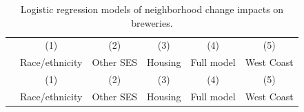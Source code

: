 \documentclass[]{article}
\begin{document}
\begin{landscape}
\begin{longtable}[c]{@{}lccccc@{}}
  \caption{Logistic regression models of neighborhood change impacts on breweries. } \\
\toprule
 & (1) & (2) & (3) & (4) & (5)\\ 
 & Race/ethnicity & Other SES & Housing & Full model & West Coast \\
\midrule
\endfirsthead

\toprule
 & (1) & (2) & (3) & (4) & (5)\\ 
 & Race/ethnicity & Other SES & Housing & Full model & West Coast \\
\midrule
\endhead


\end{longtable}
\end{landscape}
\end{document}
